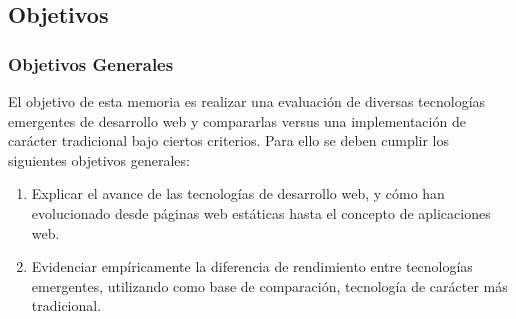 \subsection{Objetivos}

\subsubsection{Objetivos Generales}

El objetivo de esta memoria es realizar una evaluación de diversas tecnologías emergentes de desarrollo web
y compararlas versus una implementación de carácter tradicional bajo ciertos criterios. Para ello se deben cumplir 
los siguientes objetivos generales:

\begin{enumerate}
 \item Explicar el avance de las tecnologías de desarrollo web, y cómo han evolucionado desde páginas web
	estáticas hasta el concepto de aplicaciones web.
 \item Evidenciar empíricamente la diferencia de rendimiento entre tecnologías emergentes, utilizando como
	base de comparación, tecnología de carácter más tradicional.
\end{enumerate}


